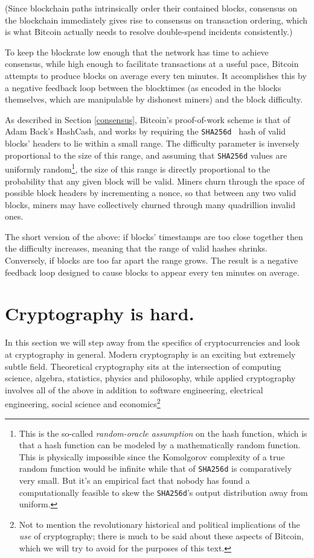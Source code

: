 \documentclass[letterpaper]{article}
\begin{document}
(Since blockchain paths intrinsically order their contained blocks, consensus on
the blockchain immediately gives rise to consensus on transaction ordering,
which is what Bitcoin actually needs to resolve double-spend incidents consistently.)

To keep the blockrate low enough that the network has time to achieve consensus,
while high enough to facilitate transactions at a useful pace, Bitcoin attempts
to produce blocks on average every ten minutes. It accomplishes this by a negative
feedback loop between the blocktimes (as encoded in the blocks themselves, which
are manipulable by dishonest miners) and the block difficulty.

As described in Section \ref{consensus}, Bitcoin's proof-of-work scheme is that
of Adam Back's HashCash, and works by requiring the \texttt{SHA256d } hash of
valid blocks' headers to lie within a small range. The difficulty parameter is
inversely proportional to the size of this range, and assuming that \texttt{SHA256d}
values are uniformly random\footnote{This is the so-called \emph{random-oracle
assumption} on the hash function, which is that a hash function can be modeled
by a mathematically random function. This is physically impossible since the
Komolgorov complexity of a true random function would be infinite while that
of \texttt{SHA256d} is comparatively very small. But it's an empirical fact
that nobody has found a computationally feasible to skew the \texttt{SHA256d}'s
output distribution away from uniform.}, the size of this range is directly
proportional to the probability that any given block will be valid. Miners
churn through the space of possible block headers by incrementing a nonce,
so that between any two valid blocks, miners may have collectively churned
through many quadrillion invalid ones.

The short version of the above: if blocks' timestamps are too close together
then the difficulty increases, meaning that the range of valid hashes shrinks.
Conversely, if blocks are too far apart the range grows. The result is a
negative feedback loop designed to cause blocks to appear every ten minutes
on average.

\section{Cryptography is hard.}

In this section we will step away from the specifics of cryptocurrencies and
look at cryptography in general. Modern cryptography is an exciting but
extremely subtle field. Theoretical cryptography sits at the intersection
of computing science, algebra, statistics, physics and philosophy, while
applied cryptography involves all of the above in addition to software
engineering, electrical engineering, social science and economics\footnote{Not
to mention the revolutionary historical and political implications of the
\emph{use} of cryptography; there is much to be said about these aspects of
Bitcoin, which we will try to avoid for the purposes of this text.}
\end{document}
